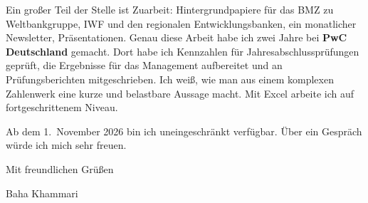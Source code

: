 \documentclass[a4paper,11pt]{article}
\begin{document}
Ein gro\ss{}er Teil der Stelle ist Zuarbeit: Hintergrundpapiere f\"ur das BMZ zu Weltbankgruppe, IWF und den regionalen Entwicklungsbanken, ein monatlicher Newsletter, Pr\"asentationen. Genau diese Arbeit habe ich zwei Jahre bei \textbf{PwC Deutschland} gemacht. Dort habe ich Kennzahlen f\"ur Jahresabschlusspr\"ufungen gepr\"uft, die Ergebnisse f\"ur das Management aufbereitet und an Pr\"ufungsberichten mitgeschrieben. Ich wei\ss{}, wie man aus einem komplexen Zahlenwerk eine kurze und belastbare Aussage macht. Mit Excel arbeite ich auf fortgeschrittenem Niveau.

Ab dem 1.\ November 2026 bin ich uneingeschr\"ankt verf\"ugbar. \"Uber ein Gespr\"ach w\"urde ich mich sehr freuen.

\vspace{4mm}

\noindent Mit freundlichen Gr\"u\ss{}en

\vspace{12mm}

\noindent Baha Khammari
\end{document}
